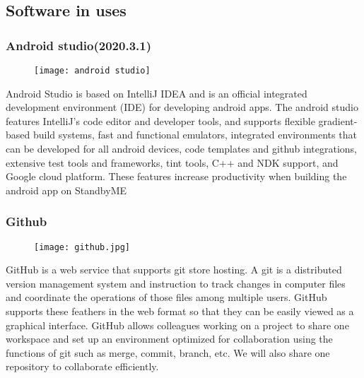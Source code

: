 \documentclass[conference]{IEEEtran}
\begin{document}
\subsection{Software in uses}
\subsubsection{Android studio(2020.3.1)}
\par \begin{figure}[H]
\texttt{[image: android studio]}
\centering
\end{figure}
Android Studio is based on IntelliJ IDEA and is an official integrated development environment (IDE) for developing android apps. The android studio features IntelliJ's code editor and developer tools, and supports flexible gradient-based build systems, fast and functional emulators, integrated environments that can be developed for all android devices, code templates and github integrations, extensive test tools and frameworks, tint tools, C++ and NDK support, and Google cloud platform. These features increase productivity when building the android app on StandbyME
\vspace{1\baselineskip}
\subsubsection{Github}
\par \begin{figure}[H]
\texttt{[image: github.jpg]}
\centering
\end{figure}
GitHub is a web service that supports git store hosting. A git is a distributed version management system and instruction to track changes in computer files and coordinate the operations of those files among multiple users. GitHub supports these feathers in the web format so that they can be easily viewed as a graphical interface. GitHub allows colleagues working on a project to share one workspace and set up an environment optimized for collaboration using the functions of git such as merge, commit, branch, etc. We will also share one repository to collaborate efficiently.
\vspace{1\baselineskip}
\end{document}
